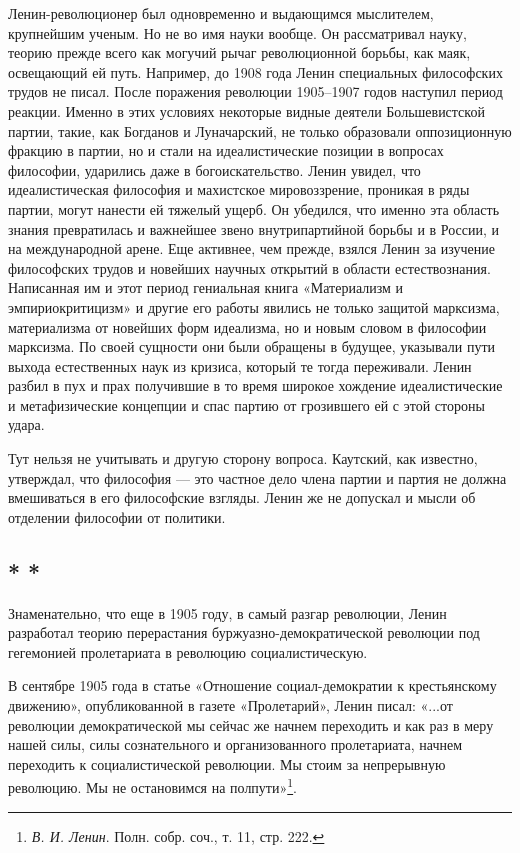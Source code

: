 \documentclass[12pt, a4paper, openany]{book}
\begin{document}
Ленин-революционер был одновременно и выдающимся мыслителем, крупнейшим ученым. Но не во имя науки вообще. Он рассматривал науку, теорию прежде всего как могучий рычаг революционной борьбы, как маяк, освещающий ей путь. Например, до 1908 года Ленин специальных философских трудов не писал. После поражения революции 1905–1907 годов наступил период реакции. Именно в этих условиях некоторые видные деятели Большевистской партии, такие, как Богданов и Луначарский, не только образовали оппозиционную фракцию в партии, но и стали на идеалистические позиции в вопросах философии, ударились даже в богоискательство. Ленин увидел, что идеалистическая философия и махистское мировоззрение, проникая в ряды партии, могут нанести ей тяжелый ущерб. Он убедился, что именно эта область знания превратилась и важнейшее звено внутрипартийной борьбы и в России, и на международной арене. Еще активнее, чем прежде, взялся Ленин за изучение философских трудов и новейших научных открытий в области естествознания. Написанная им и этот период гениальная книга «Материализм и эмпириокритицизм» и другие его работы явились не только защитой марксизма, материализма от новейших форм идеализма, но и новым словом в философии марксизма. По своей сущности они были обращены в будущее, указывали пути выхода естественных наук из кризиса, который те тогда переживали. Ленин разбил в пух и прах получившие в то время широкое хождение идеалистические и метафизические концепции и спас партию от грозившего ей с этой стороны удара.

Тут нельзя не учитывать и другую сторону вопроса. Каутский, как известно, утверждал, что философия — это частное дело члена партии и партия не должна вмешиваться в его философские взгляды. Ленин же не допускал и мысли об отделении философии от политики.

\subsection*{\center * * *}

Знаменательно, что еще в 1905 году, в самый разгар революции, Ленин разработал теорию перерастания буржуазно-демократической революции под гегемонией пролетариата в революцию социалистическую.

В сентябре 1905 года в статье «Отношение социал-демократии к крестьянскому движению», опубликованной в газете «Пролетарий», Ленин писал: «...от революции демократической мы сейчас же начнем переходить и как раз в меру нашей силы, силы сознательного и организованного пролетариата, начнем переходить к социалистической революции. Мы стоим за непрерывную революцию. Мы не остановимся на полпути»\footnote{\textit{В. И. Ленин}. Полн. собр. соч., т. 11, стр. 222.}.
\end{document}
